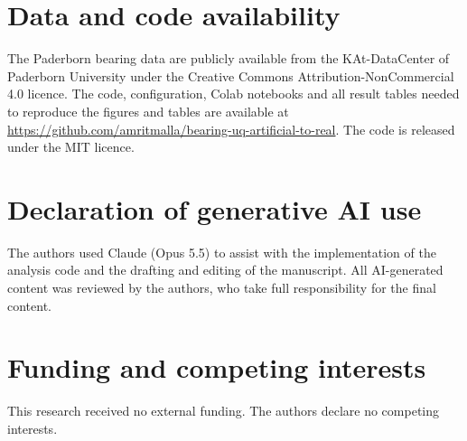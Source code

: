 
\section*{Data and code availability}

The Paderborn bearing data are publicly available from the KAt-DataCenter of Paderborn University
\citep{katdatacenter} under the Creative Commons Attribution-NonCommercial 4.0 licence. The code, configuration,
Colab notebooks and all result tables needed to reproduce the figures and tables are available at
\url{https://github.com/amritmalla/bearing-uq-artificial-to-real}. The code is released under the MIT licence.

\section*{Declaration of generative AI use}

The authors used Claude (Opus 5.5) to assist with the implementation of the analysis code and the drafting and editing
of the manuscript. All AI-generated content was reviewed by the authors, who take full responsibility for the final
content.

\section*{Funding and competing interests}

This research received no external funding. The authors declare no competing interests.
